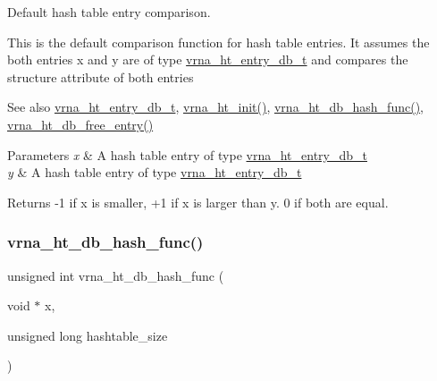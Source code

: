 Default hash table entry comparison. 

This is the default comparison function for hash table entries. It assumes the both entries {\ttfamily x} and {\ttfamily y} are of type \mbox{\hyperlink{group__hash__table__utils_structvrna__ht__entry__db__t}{vrna\+\_\+ht\+\_\+entry\+\_\+db\+\_\+t}} and compares the {\ttfamily structure} attribute of both entries

\begin{DoxySeeAlso}{See also}
\mbox{\hyperlink{group__hash__table__utils_structvrna__ht__entry__db__t}{vrna\+\_\+ht\+\_\+entry\+\_\+db\+\_\+t}}, \mbox{\hyperlink{group__hash__table__utils_ga37d1c7e13087a2b7c1b87fda34577c29}{vrna\+\_\+ht\+\_\+init()}}, \mbox{\hyperlink{group__hash__table__utils_gad133721a3cd2f8ca259fe315d86035a7}{vrna\+\_\+ht\+\_\+db\+\_\+hash\+\_\+func()}}, \mbox{\hyperlink{group__hash__table__utils_gabcdcd0d070b3dfd2634a09e7838acf66}{vrna\+\_\+ht\+\_\+db\+\_\+free\+\_\+entry()}}
\end{DoxySeeAlso}

\begin{DoxyParams}{Parameters}
{\em x} & A hash table entry of type \mbox{\hyperlink{group__hash__table__utils_structvrna__ht__entry__db__t}{vrna\+\_\+ht\+\_\+entry\+\_\+db\+\_\+t}} \\
\hline
{\em y} & A hash table entry of type \mbox{\hyperlink{group__hash__table__utils_structvrna__ht__entry__db__t}{vrna\+\_\+ht\+\_\+entry\+\_\+db\+\_\+t}} \\
\hline
\end{DoxyParams}
\begin{DoxyReturn}{Returns}
-\/1 if x is smaller, +1 if x is larger than y. 0 if both are equal. 
\end{DoxyReturn}
\mbox{\label{group__hash__table__utils_gad133721a3cd2f8ca259fe315d86035a7}} 
\subsubsection{\texorpdfstring{vrna\_ht\_db\_hash\_func()}{vrna\_ht\_db\_hash\_func()}}
{\footnotesize\ttfamily unsigned int vrna\+\_\+ht\+\_\+db\+\_\+hash\+\_\+func (\begin{DoxyParamCaption}\item[{void $\ast$}]{x,  }\item[{unsigned long}]{hashtable\+\_\+size }\end{DoxyParamCaption})}



